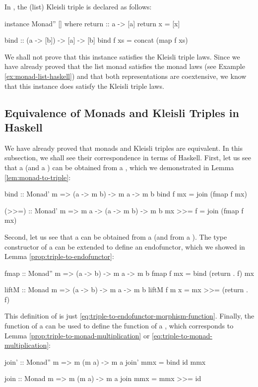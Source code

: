 \begin{example}
  \label{ex:triple-list-haskell}

  In \hask, the \texthaskell{[]} (list) Kleisli triple is declared as
  follows:
  \begin{codehaskell}
instance Monad'' [] where
  return :: a -> [a]
  return x = [x]

  bind :: (a -> [b]) -> [a] -> [b]
  bind f xs = concat (map f xs)
  \end{codehaskell}
  We shall not prove that this instance satisfies the Kleisli triple
  laws. Since we have already proved that the list monad satisfies the
  monad laws (see Example \ref{ex:monad-list-haskell}) and that both
  representations are coextensive, we know that this instance does
  satisfy the Kleisli triple laws.

\end{example}

\subsection{Equivalence of Monads and Kleisli Triples in Haskell}

We have already proved that monads and Kleisli triples are equivalent.
In this subsection, we shall see their correspondence in terms of
Haskell. First, let us see that a  (and a
) can be obtained from a ,
which we demonstrated in Lemma \ref{lem:monad-to-triple}:
\begin{codehaskell}
bind :: Monad' m => (a -> m b) -> m a -> m b
bind f mx = join (fmap f mx)

(>>=) :: Monad' m => m a -> (a -> m b) -> m b
mx >>= f = join (fmap f mx)
\end{codehaskell}

Second, let us see that a  can be obtained from a
 (and from a ). The type
constructor of a  can be extended to define an
endofunctor, which we showed in Lemma
\ref{prop:triple-to-endofunctor}:
\begin{codehaskell}
fmap :: Monad'' m => (a -> b) -> m a -> m b
fmap f mx = bind (return . f) mx

liftM :: Monad m => (a -> b) -> m a -> m b
liftM f m x = mx >>= (return . f)
\end{codehaskell}
This definition of  is just
\eqref{eq:triple-to-endofunctor-morphism-function}. Finally, the
 function of a  can be used to
define the  function of a ,
which corresponds to Lemma \ref{prop:triple-to-monad-multiplication}
or \eqref{eq:triple-to-monad-multiplication}:
\begin{codehaskell}
join' :: Monad'' m => m (m a) -> m a
join' mmx = bind id mmx

join :: Monad m => m (m a) -> m a
join mmx = mmx >>= id
\end{codehaskell}


